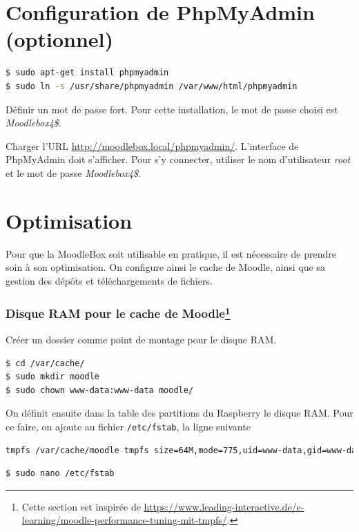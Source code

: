 \documentclass[11pt]{article}
\begin{document}
\section{Configuration de PhpMyAdmin (optionnel)}

\begin{lstlisting}[language=bash]
$ sudo apt-get install phpmyadmin
$ sudo ln -s /usr/share/phpmyadmin /var/www/html/phpmyadmin
\end{lstlisting}
Définir un mot de passe fort. Pour cette installation, le mot de passe choisi est \emph{Moodlebox4\$}.

\begin{verification}
Charger l'URL \url{http://moodlebox.local/phpmyadmin/}. L'interface de PhpMyAdmin doit s'afficher. Pour s'y connecter, utiliser le nom d'utilisateur \emph{root} et le mot de passe \emph{Moodlebox4\$}.
\end{verification}

\section{Optimisation}

Pour que la MoodleBox soit utilisable en pratique, il est nécessaire de prendre soin à son optimisation. On configure ainsi le cache de Moodle, ainsi que sa gestion des dépôts et téléchargements de fichiers.

\subsubsection[Disque RAM pour le cache de Moodle]{Disque RAM pour le cache de Moodle\footnote{Cette section est inspirée de \url{https://www.leading-interactive.de/e-learning/moodle-performance-tuning-mit-tmpfs/}.}}

Créer un dossier comme point de montage pour le disque RAM.
\begin{lstlisting}[language=bash]
$ cd /var/cache/
$ sudo mkdir moodle
$ sudo chown www-data:www-data moodle/
\end{lstlisting}

On définit ensuite dans la table des partitions du Raspberry le disque RAM. Pour ce faire, on ajoute au fichier \lstinline{/etc/fstab}, la ligne suivante
\begin{lstlisting}[language=bash]
tmpfs /var/cache/moodle tmpfs size=64M,mode=775,uid=www-data,gid=www-data 0 0
\end{lstlisting}

\begin{lstlisting}[language=bash]
$ sudo nano /etc/fstab
\end{lstlisting}
\end{document}
